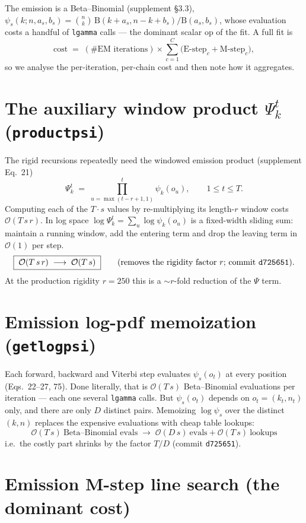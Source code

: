 \documentclass[11pt]{article}
\newcommand{\bigO}{\mathcal{O}}
\newcommand{\code}[1]{\texttt{#1}}
\begin{document}
\noindent
The emission is a Beta--Binomial (supplement \S3.3),
$\psi_s(k;n,a_s,b_s)=\binom{n}{k}\,\mathrm{B}(k+a_s,n-k+b_s)/\mathrm{B}(a_s,b_s)$,
whose evaluation costs a handful of \code{lgamma} calls --- the dominant scalar
op of the fit. A full fit is
\[
\text{cost} \;=\; (\#\text{EM iterations})\times\sum_{c=1}^{C}\big(\text{E-step}_c + \text{M-step}_c\big),
\]
so we analyse the per-iteration, per-chain cost and then note how it aggregates.

\section{The auxiliary window product $\Psi^t_k$ (\code{productpsi})}

The rigid recursions repeatedly need the windowed emission product
(supplement Eq.~21)
\begin{equation}
\Psi^{t}_k \;=\; \prod_{u=\max(t-r+1,1)}^{t}\psi_k(o_u),
\qquad 1\le t\le T .
\tag{21}
\end{equation}
Computing each of the $T\cdot s$ values by re-multiplying its length-$r$ window
costs $\bigO(T\,s\,r)$. In log space $\log\Psi^t_k=\sum_{u}\log\psi_k(o_u)$ is a
fixed-width sliding sum: maintain a running window, add the entering term and
drop the leaving term in $\bigO(1)$ per step.
\[
\boxed{\;\bigO(T\,s\,r)\;\longrightarrow\;\bigO(T\,s)\;}
\qquad\text{(removes the rigidity factor }r\text{; commit \code{d725651}).}
\]
At the production rigidity $r=250$ this is a $\sim r$-fold reduction of the
$\Psi$ term.

\section{Emission log-pdf memoization (\code{getlogpsi})}

Each forward, backward and Viterbi step evaluates $\psi_s(o_t)$ at every position
(Eqs.~22--27, 75). Done literally, that is $\bigO(T\,s)$ Beta--Binomial
evaluations per iteration --- each one several \code{lgamma} calls. But
$\psi_s(o_t)$ depends on $o_t=(k_t,n_t)$ only, and there are only $D$ distinct
pairs. Memoizing $\log\psi_s$ over the distinct $(k,n)$ replaces the expensive
evaluations with cheap table lookups:
\[
\boxed{\;\bigO(T\,s)\ \text{Beta--Binomial evals}\;\longrightarrow\;\bigO(D\,s)\ \text{evals} + \bigO(T\,s)\ \text{lookups}\;}
\]
i.e.\ the costly part shrinks by the factor $T/D$ (commit \code{d725651}).

\section{Emission M-step line search (the dominant cost)}
\end{document}
